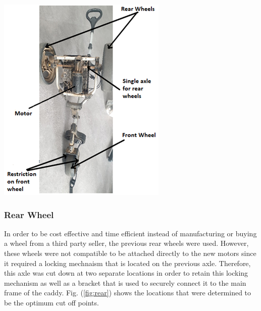 \documentclass[11pt,landscape]{article}
\newenvironment{Figure}
  {\par\medskip\noindent\minipage{\linewidth}}
  {\endminipage\par\medskip}
\begin{document}
\begin{multicols}{2}
\begin{Figure}
    \begin{center}
        \includegraphics[width=\textwidth]{Picture2.PNG}
        \label{fig:train}
    \end{center}
\end{Figure}
\newpage
\subsubsection{Rear Wheel}
In order to be cost effective and time efficient instead of manufacturing or
buying a wheel from a third party seller, the previous rear wheels were
used. However, these wheels were not compatible to be attached directly to
the new motors since it required a locking mechnaism that is located on the
previous axle. Therefore, this axle was cut down at two separate locations
in order to retain this locking mechanism as well as a bracket that is used
to securely connect it to the main frame of the caddy. Fig. (\ref{fig:rear})
shows the locations that were determined to be the optimum cut off points.


\end{multicols}
\end{document}
